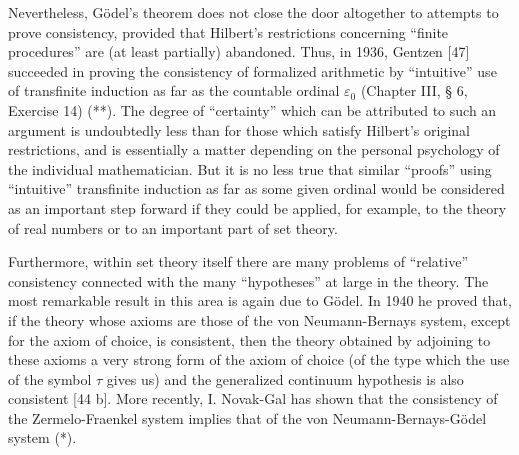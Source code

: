 Nevertheless, Gödel's theorem does not close the door altogether to attempts to prove consistency, provided that Hilbert's restrictions concerning ``finite procedures'' are (at least partially) abandoned. Thus, in 1936, Gentzen {[}47{]} succeeded in proving the consistency of formalized arithmetic by ``intuitive'' use of transfinite induction as far as the countable ordinal \(\varepsilon_0\) (Chapter III, § 6, Exercise 14) (**). The degree of ``certainty'' which can be attributed to such an argument is undoubtedly less than for those which satisfy Hilbert's original restrictions, and is essentially a matter depending on the personal psychology of the individual mathematician. But it is no less true that similar ``proofs'' using ``intuitive'' transfinite induction as far as some given ordinal would be considered as an important step forward if they could be applied, for example, to the theory of real numbers or to an important part of set theory.

Furthermore, within set theory itself there are many problems of ``relative'' consistency connected with the many ``hypotheses'' at large in the theory. The most remarkable result in this area is again due to Gödel. In 1940 he proved that, if the theory whose axioms are those of the von Neumann-Bernays system, except for the axiom of choice, is consistent, then the theory obtained by adjoining to these axioms a very strong form of the axiom of choice (of the type which the use of the symbol \(\tau\) gives us) and the generalized continuum hypothesis is also consistent {[}44 b{]}. More recently, I. Novak-Gal has shown that the consistency of the Zermelo-Fraenkel system implies that of the von Neumann-Bernays-Gödel system (*).

